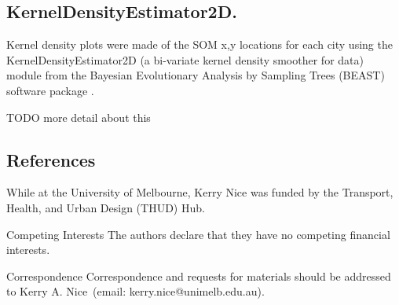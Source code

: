\documentclass{nature}
\begin{document}
\begin{methods}
\subsection{KernelDensityEstimator2D.}\label{kerneldensity}

Kernel density plots were made of the SOM x,y locations for each city using the KernelDensityEstimator2D (a bi-variate kernel density smoother for data) module from the Bayesian Evolutionary Analysis by Sampling Trees (BEAST) software package \cite{Suchard2018}.


TODO more detail about this


\end{methods}


\subsection{References}\label{ref}









\begin{addendum}
 \item While at the University of Melbourne, Kerry Nice was funded by the Transport, Health, and Urban Design (THUD) Hub.
 \item[Competing Interests] The authors declare that they have no
competing financial interests.
 \item[Correspondence] Correspondence and requests for materials
should be addressed to Kerry A. Nice~(email: kerry.nice@unimelb.edu.au).
\end{addendum}
\end{document}
